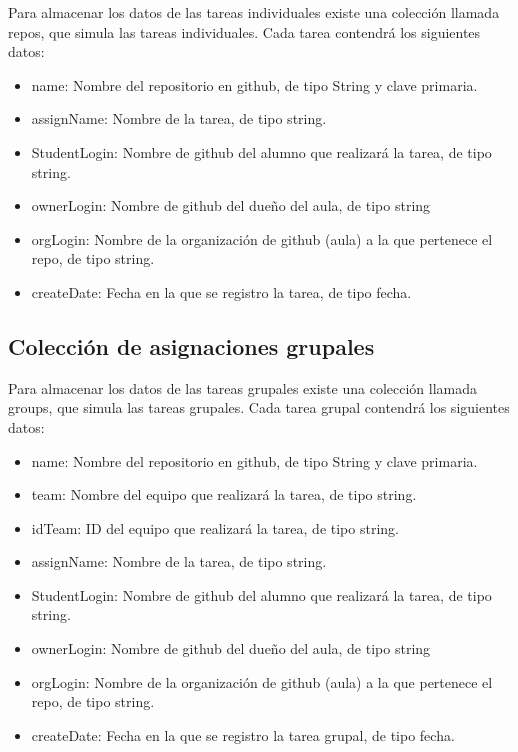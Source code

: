Para almacenar los datos de las tareas individuales existe una colección llamada repos, que simula las tareas individuales. Cada tarea contendrá los siguientes datos:

\begin{itemize}
  \item name: Nombre del repositorio en github, de tipo String y clave primaria.
  \item assignName: Nombre de la tarea, de tipo string.
  \item StudentLogin: Nombre de github del alumno que realizará la tarea, de tipo string.
  \item ownerLogin: Nombre de github del dueño del aula, de tipo string
  \item orgLogin: Nombre de la organización de github (aula) a la que pertenece el repo, de tipo string.
  \item createDate: Fecha en la que se registro la tarea, de tipo fecha.
\end{itemize}

\subsection{Colección de asignaciones grupales}
\label{3:4:5}

Para almacenar los datos de las tareas grupales existe una colección llamada groups, que simula las tareas grupales. Cada tarea grupal contendrá los siguientes datos:

\begin{itemize}
  \item name: Nombre del repositorio en github, de tipo String y clave primaria.
  \item team: Nombre del equipo que realizará la tarea, de tipo string.
  \item idTeam: ID del equipo que realizará la tarea, de tipo string.
  \item assignName: Nombre de la tarea, de tipo string.
  \item StudentLogin: Nombre de github del alumno que realizará la tarea, de tipo string.
  \item ownerLogin: Nombre de github del dueño del aula, de tipo string
  \item orgLogin: Nombre de la organización de github (aula) a la que pertenece el repo, de tipo string.
  \item createDate: Fecha en la que se registro la tarea grupal, de tipo fecha.
\end{itemize}

